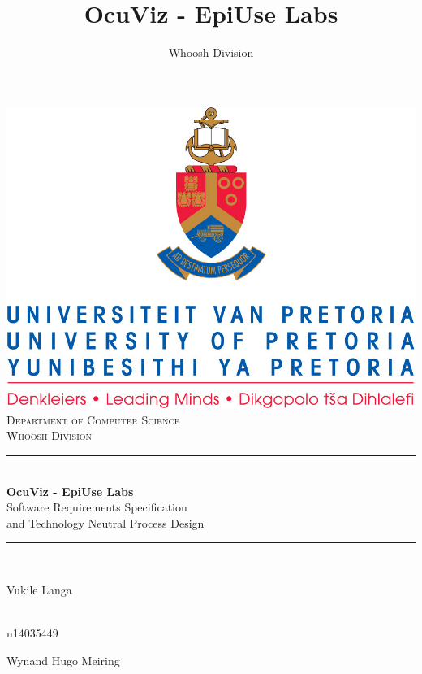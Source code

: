 \documentclass[a4paper,12pt]{article}
\author{Whoosh Division}
\title{OcuViz - EpiUse Labs}
\newcommand{\HRule}{\rule{\linewidth}{0.5mm}}
\begin{document}
\setlength{\parskip}{6pt}

\begin{titlepage}

\begin{center}
\includegraphics[width=1\textwidth]{./images/up-logo.jpg}\\[0.4cm]    
\textsc{\LARGE Department of Computer Science}\\[1.5cm]
\textsc{\Large Whoosh Division}\\[0.3cm]
\HRule \\[0.4cm]
{ \huge \bfseries OcuViz - EpiUse Labs}\\[0.4cm]
{ \huge Software Requirements Specification\\[0.4cm]and Technology Neutral Process Design }\\[0.4cm]
\HRule \\[0.4cm]
\begin{minipage}{0.4\textwidth}
\begin{flushleft} \large
Vukile {Langa}
\end{flushleft}
\end{minipage}
\begin{minipage}{0.4\textwidth}
\begin{flushright} \large
\emph{} \\
u14035449 
\end{flushright}
\end{minipage}
\begin{minipage}{0.4\textwidth}
\begin{flushleft} \large
Wynand Hugo Meiring

\end{flushleft}
\end{minipage}
\end{center}
\end{titlepage}
\end{document}
